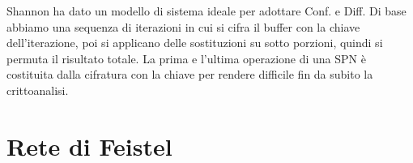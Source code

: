 Shannon ha dato un modello di sistema ideale per adottare Conf. e Diff. Di base abbiamo una sequenza di iterazioni in cui si cifra il buffer con la chiave dell'iterazione, poi si applicano delle sostituzioni su sotto porzioni, quindi si permuta il risultato totale. La prima e l'ultima operazione di una SPN \`e costituita dalla cifratura con la chiave per rendere difficile fin da subito la crittoanalisi.


\section{Rete di Feistel}


